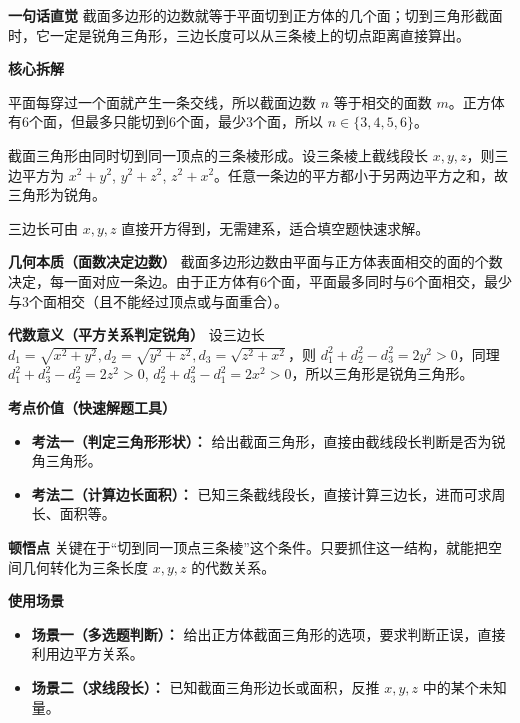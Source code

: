 \begin{explanationbox}
	\textbf{\textcolor{CExplanation}{一句话直觉}}
	截面多边形的边数就等于平面切到正方体的几个面；切到三角形截面时，它一定是锐角三角形，三边长度可以从三条棱上的切点距离直接算出。

	\medskip
	\textbf{\textcolor{CExplanation}{核心拆解}}
	\begin{description}[style=nextline, leftmargin=2.8em, labelsep=0.5em, itemsep=0.45em]
		\item[\textbf{要点一（边数等于面数）：}]
			平面每穿过一个面就产生一条交线，所以截面边数 $n$ 等于相交的面数 $m$。正方体有6个面，但最多只能切到6个面，最少3个面，所以 $n\in\{3,4,5,6\}$。
		\item[\textbf{要点二（三角形必锐角）：}]
			截面三角形由同时切到同一顶点的三条棱形成。设三条棱上截线段长 $x,y,z$，则三边平方为 $x^2+y^2$, $y^2+z^2$, $z^2+x^2$。任意一条边的平方都小于另两边平方之和，故三角形为锐角。
		\item[\textbf{要点三（边长直接计算）：}]
			三边长可由 $x,y,z$ 直接开方得到，无需建系，适合填空题快速求解。
	\end{description}

	\medskip
	\textbf{\textcolor{CExplanation}{几何本质（面数决定边数）}}
	截面多边形边数由平面与正方体表面相交的面的个数决定，每一面对应一条边。由于正方体有6个面，平面最多同时与6个面相交，最少与3个面相交（且不能经过顶点或与面重合）。

	\medskip
	\textbf{\textcolor{CExplanation}{代数意义（平方关系判定锐角）}}
	设三边长 $d_1=\sqrt{x^2+y^2}, d_2=\sqrt{y^2+z^2}, d_3=\sqrt{z^2+x^2}$，则 $d_1^2+d_2^2-d_3^2=2y^2>0$，同理 $d_1^2+d_3^2-d_2^2=2z^2>0$, $d_2^2+d_3^2-d_1^2=2x^2>0$，所以三角形是锐角三角形。

	\medskip
	\textbf{\textcolor{CExplanation}{考点价值（快速解题工具）}}
	\begin{itemize}[leftmargin=*, itemsep=0.5em, topsep=0.4em]
		\item \textbf{考法一（判定三角形形状）：} 给出截面三角形，直接由截线段长判断是否为锐角三角形。
		\item \textbf{考法二（计算边长面积）：} 已知三条截线段长，直接计算三边长，进而可求周长、面积等。
	\end{itemize}

	\medskip
	\textbf{\textcolor{CExplanation}{顿悟点}}
	关键在于“切到同一顶点三条棱”这个条件。只要抓住这一结构，就能把空间几何转化为三条长度 $x,y,z$ 的代数关系。

	\medskip
	\textbf{\textcolor{CExplanation}{使用场景}}
	\begin{itemize}[leftmargin=*, itemsep=0.5em, topsep=0.4em]
		\item \textbf{场景一（多选题判断）：} 给出正方体截面三角形的选项，要求判断正误，直接利用边平方关系。
		\item \textbf{场景二（求线段长）：} 已知截面三角形边长或面积，反推 $x,y,z$ 中的某个未知量。
	\end{itemize}

\end{explanationbox}
